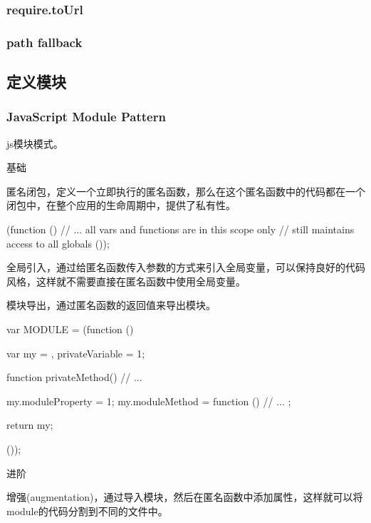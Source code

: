\subsubsection{require.toUrl}

\subsubsection{path fallback}


\subsection{定义模块}

\subsubsection{JavaScript Module Pattern}

js模块模式。

基础

匿名闭包，定义一个立即执行的匿名函数，那么在这个匿名函数中的代码都在一个闭包中，在整个应用的生命周期中，提供了私有性。


\begin{JavaScript}[有没有括号是函数声明和函数表达式的区别]
(function () {
	// ... all vars and functions are in this scope only
	// still maintains access to all globals
}());
\end{JavaScript}

全局引入，通过给匿名函数传入参数的方式来引入全局变量，可以保持良好的代码风格，这样就不需要直接在匿名函数中使用全局变量。


模块导出，通过匿名函数的返回值来导出模块。

\begin{JavaScript}
var MODULE = (function () {
	var my = {},
		privateVariable = 1;

	function privateMethod() {
		// ...
	}

	my.moduleProperty = 1;
	my.moduleMethod = function () {
		// ...
	};

	return my;
}());
\end{JavaScript}

进阶

增强(augmentation)，通过导入模块，然后在匿名函数中添加属性，这样就可以将module的代码分割到不同的文件中。

